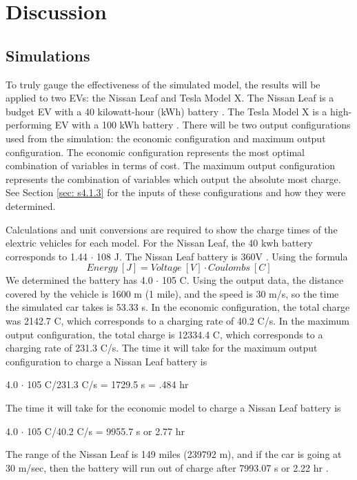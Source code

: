 
\renewcommand{\thechapter}{5}

\chapter{Discussion}

\section{Simulations}
To truly gauge the effectiveness of the simulated model, the results will be applied to two EVs: 
the Nissan Leaf and Tesla Model X. The Nissan Leaf is a budget EV with a 40 kilowatt-hour (kWh) 
battery \cite{noauthor_2021_nodate}. The Tesla Model X is a high-performing EV with a 100 kWh battery 
\cite{noauthor_model_nodate}. There will be two output configurations used from the simulation: the economic 
configuration and maximum output configuration. The economic configuration represents the most optimal 
combination of variables in terms of cost. The maximum output configuration represents the combination 
of variables which output the absolute most charge. See Section \ref{sec: s4.1.3} for the inputs of these 
configurations and how they were determined. 

Calculations and unit conversions are required to show the charge times of the elextric vehicles for each model. 
For the Nissan Leaf, the 40 kwh battery corresponds to 1.44 $\cdot$ 108 J. The Nissan Leaf battery is 360V 
\cite{noauthor_2021_nodate}. Using the formula 
\begin{equation}
    Energy \: [J] = Voltage \: [V] \cdot Coulombs \: [C]
\end{equation}
We determined the battery has 4.0 $\cdot$ 105 C. Using the output data, the distance covered by the vehicle 
is 1600 m (1 mile), and the speed is 30 m/s, so the time the simulated car takes is 53.33 s. In the economic 
configuration, the total charge was 2142.7 C, which corresponds to a charging rate of 40.2 C/s. In the maximum 
output configuration, the total charge is 12334.4 C, which corresponds to a charging rate of 231.3 C/s. 
The time it will take for the maximum output configuration to charge a Nissan Leaf battery is 
\begin{center}
    4.0 $\cdot$ 105 C/231.3 C/s = 1729.5 s = .484 hr
\end{center}
The time it will take for the economic model to charge a Nissan Leaf battery is 
\begin{center}
    4.0 $\cdot$ 105 C/40.2 C/s = 9955.7 s or 2.77 hr
\end{center}
The range of the Nissan Leaf is 149 miles (239792 m), and if the car is going at 30 m/sec, then the battery will 
run out of charge after 7993.07 s or 2.22 hr \cite{noauthor_2021_nodate}.

